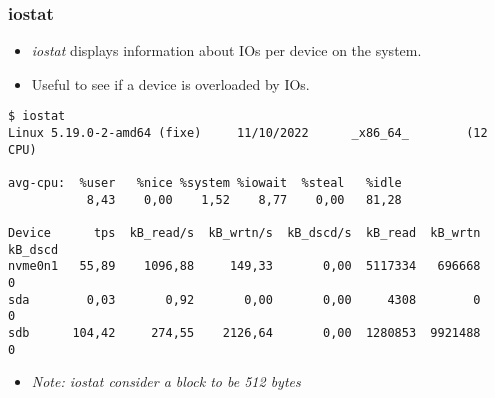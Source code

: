 \begin{frame}[fragile]
  \frametitle{iostat}
  \begin{itemize}
    \item {\em iostat} displays information about IOs per device on the system.
    \item Useful to see if a device is overloaded by IOs.
  \end{itemize}
  \begin{block}{}
    \begin{verbatim}
$ iostat 
Linux 5.19.0-2-amd64 (fixe)     11/10/2022      _x86_64_        (12 CPU)

avg-cpu:  %user   %nice %system %iowait  %steal   %idle
           8,43    0,00    1,52    8,77    0,00   81,28

Device      tps  kB_read/s  kB_wrtn/s  kB_dscd/s  kB_read  kB_wrtn  kB_dscd
nvme0n1   55,89    1096,88     149,33       0,00  5117334   696668        0
sda        0,03       0,92       0,00       0,00     4308        0        0
sdb      104,42     274,55    2126,64       0,00  1280853  9921488        0
    \end{verbatim}
  \end{block}
  \begin{itemize}
    \item {\em Note: iostat consider a block to be 512 bytes}
  \end{itemize}
\end{frame}

